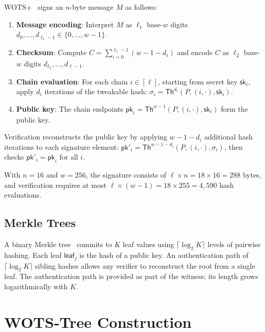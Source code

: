 \documentclass[11pt,a4paper]{article}
\theoremstyle{definition}
\begin{document}
WOTS+~\cite{hulsing2013wots} signs an $n$-byte message $M$ as follows:

\begin{enumerate}[nosep]
    \item \textbf{Message encoding}: Interpret $M$ as $\ell_1$ base-$w$ digits $d_0, \ldots, d_{\ell_1 - 1} \in \{0, \ldots, w-1\}$.
    \item \textbf{Checksum}: Compute $C = \sum_{i=0}^{\ell_1-1} (w - 1 - d_i)$ and encode $C$ as $\ell_2$ base-$w$ digits $d_{\ell_1}, \ldots, d_{\ell-1}$.
    \item \textbf{Chain evaluation}: For each chain $i \in [\ell]$, starting from secret key $\mathsf{sk}_i$, apply $d_i$ iterations of the tweakable hash: $\sigma_i = \mathsf{Th}^{d_i}(P, (i, \cdot), \mathsf{sk}_i)$.
    \item \textbf{Public key}: The chain endpoints $\mathsf{pk}_i = \mathsf{Th}^{w-1}(P, (i, \cdot), \mathsf{sk}_i)$ form the public key.
\end{enumerate}

Verification reconstructs the public key by applying $w - 1 - d_i$ additional hash iterations to each signature element: $\mathsf{pk}'_i = \mathsf{Th}^{w-1-d_i}(P, (i, \cdot), \sigma_i)$, then checks $\mathsf{pk}'_i = \mathsf{pk}_i$ for all $i$.

With $n = 16$ and $w = 256$, the signature consists of $\ell \times n = 18 \times 16 = 288$ bytes, and verification requires at most $\ell \times (w-1) = 18 \times 255 = 4{,}590$ hash evaluations.

\subsection{Merkle Trees}
\label{sec:merkle-background}

A binary Merkle tree~\cite{merkle1989certified} commits to $K$ leaf values using $\lceil\log_2 K\rceil$ levels of pairwise hashing. Each leaf $\mathsf{leaf}_j$ is the hash of a public key. An authentication path of $\lceil\log_2 K\rceil$ sibling hashes allows any verifier to reconstruct the root from a single leaf. The authentication path is provided as part of the witness; its length grows logarithmically with $K$.

\section{WOTS-Tree Construction}
\label{sec:construction}
\end{document}
